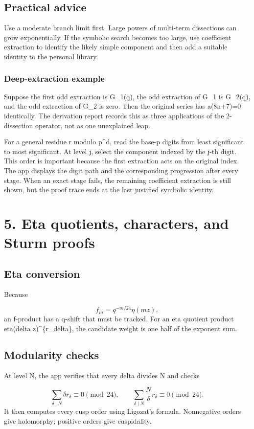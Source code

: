 \documentclass[11pt]{article}
\begin{document}
\subsection*{Practical advice}
Use a moderate branch limit first. Large powers of multi-term dissections can grow exponentially. If the symbolic search becomes too large, use coefficient extraction to identify the likely simple component and then add a suitable identity to the personal library.

\subsubsection*{Deep-extraction example}
Suppose the first odd extraction is G\_1(q), the odd extraction of G\_1 is G\_2(q), and the odd extraction of G\_2 is zero. Then the original series has a(8n+7)=0 identically. The derivation report records this as three applications of the 2-dissection operator, not as one unexplained leap.

For a general residue r modulo p\textasciicircum{}d, read the base-p digits from least significant to most significant. At level j, select the component indexed by the j-th digit. This order is important because the first extraction acts on the original index. The app displays the digit path and the corresponding progression after every stage. When an exact stage fails, the remaining coefficient extraction is still shown, but the proof trace ends at the last justified symbolic identity.

\newpage
\section{5. Eta quotients, characters, and Sturm proofs}
\subsection*{Eta conversion}
Because

\[
f_m=q^{-m/24}\eta(mz),
\]
an f-product has a q-shift that must be tracked. For an eta quotient product eta(delta z)\textasciicircum{}\{r\_delta\}, the candidate weight is one half of the exponent sum.

\subsection*{Modularity checks}
At level N, the app verifies that every delta divides N and checks

\[
\sum_{\delta\mid N}\delta r_\delta\equiv0\pmod{24},\qquad
\sum_{\delta\mid N}\frac{N}{\delta}r_\delta\equiv0\pmod{24}.
\]
It then computes every cusp order using Ligozat's formula. Nonnegative orders give holomorphy; positive orders give cuspidality.
\end{document}
